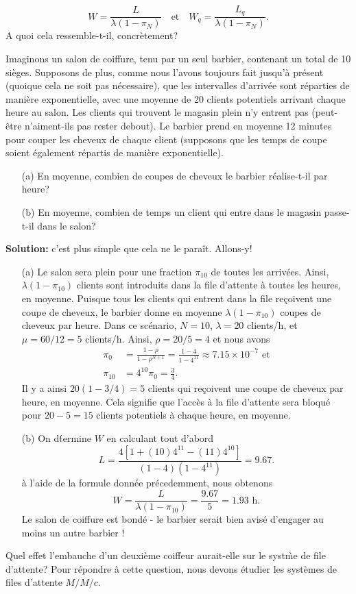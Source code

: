$$ W = \frac{L}{\lambda\left(1-\pi_{N}\right)}\quad \text{et}\quad W_{q} = \frac{L_{q}}{\lambda\left(1-\pi_{N}\right)}.$$
A quoi cela ressemble-t-il, concrètement? 
\begin{Exemple} Imaginons un salon de coiffure, tenu par un seul barbier, contenant un total de 10 sièges. Supposons de plus, comme nous l'avons toujours fait jusqu'à présent (quoique cela ne soit pas nécessaire), que les intervalles d'arrivée sont réparties de manière exponentielle, avec une moyenne de 20 clients potentiels arrivant chaque heure au salon. Les clients qui trouvent le magasin plein n'y entrent pas (peut-être n'aiment-ils pas rester debout). Le barbier prend en moyenne 12 minutes pour couper les cheveux de chaque client (supposons que les temps de coupe soient également répartis de manière exponentielle).
\begin{itemize}[noitemsep]
	\item[(a)] En moyenne, combien de coupes de cheveux le barbier réalise-t-il par heure?
	\item[(b)] En moyenne, combien de temps un client qui entre dans le magasin passe-t-il dans le salon?
\end{itemize}
\textbf{Solution:} c'est plus simple que cela ne le paraît. Allons-y!
\begin{itemize}[noitemsep]
	\item[(a)] Le salon sera plein pour une fraction $\pi_{10}$ de toutes les arrivées. Ainsi, $\lambda\left(1-\pi_{10}\right)$ clients sont introduits dans la file d'attente à toutes les heures, en moyenne.  Puisque tous les clients qui entrent dans la file reçoivent une coupe de cheveux, le barbier donne en  moyenne $\lambda\left(1-\pi_{10}\right)$ coupes de cheveux par heure. Dans ce scénario, $N=10$, $\lambda=20$ clients/h, et $\mu=60/12 = 5 $ clients/h. Ainsi, $\rho= 20/5 = 4$ et nous avons 
	\begin{align*} \pi_{0} &= \frac{1-\rho}{1-\rho^{N+1}} = \frac{1-4}{1-4^{11}}\approx 7.15\times 10^{-7}  \text{ et} \\ \pi_{10} &= 4^{10} \pi_{0} = \frac{3}{4}.\end{align*}
Il y a ainsi $20 (1 - 3/4) = 5$ clients qui reçoivent une coupe de cheveux par heure, en moyenne. Cela signifie que l'accès à la file d'attente sera bloqué pour $20 - 5 = 15 $  clients potentiels à chaque heure, en moyenne. 	
\item[(b)] On d\'termine $W$ en calculant tout d'abord
$$L = \frac{4 [1+ (10) 4^{11} - (11) 4^{10} ]}{(1-4)\left(1-4^{11}\right)} = 9.67.$$ 
à l'aide de la formule donnée précedemment, nous obtenons 
$$ W = \frac{L}{\lambda\left(1-\pi_{10}\right)} = \frac{9.67}{5} = 1.93 \text{ h}.$$
Le salon de coiffure est bondé - le barbier serait bien avisé d'engager au moins un autre barbier !
\end{itemize}
\end{Exemple}
\noindent Quel effet l'embauche d'un deuxième coiffeur aurait-elle sur le syst\`me de file d'attente? Pour répondre à cette question, nous devons étudier les systèmes de files d'attente $M/M/c$.   
